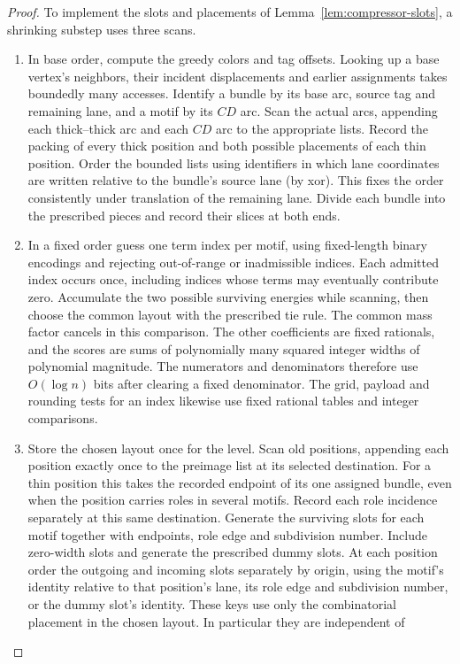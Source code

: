 \begin{proof}
To implement the slots and placements of Lemma~\ref{lem:compressor-slots},
a shrinking substep uses three scans.
\begin{enumerate}
\item In base order, compute the greedy colors and tag offsets. Looking
up a base vertex's neighbors, their incident displacements and earlier
assignments takes boundedly many accesses. Identify a bundle by its base
arc, source tag and remaining lane, and a motif by its $CD$ arc. Scan the
actual arcs, appending each thick--thick arc and each $CD$ arc to the
appropriate lists. Record the packing of every thick position and both
possible placements of each thin position. Order the bounded lists using
identifiers in which lane coordinates are written relative to the bundle's
source lane (by xor). This fixes the order consistently under translation
of the remaining lane. Divide each bundle into the prescribed pieces and
record their slices at both ends.
\item In a fixed order guess one term index per motif, using fixed-length
binary encodings and rejecting out-of-range or inadmissible indices. Each
admitted index occurs once, including indices whose terms may eventually
contribute zero. Accumulate the two possible surviving energies while
scanning, then choose the common layout with the prescribed tie rule. The
common mass factor cancels in this comparison. The other coefficients are
fixed rationals, and the scores are sums of polynomially many squared
integer widths of polynomial magnitude. The numerators and denominators
therefore use $O(\log n)$ bits after clearing a fixed denominator.
The grid, payload and rounding tests for an index likewise use fixed
rational tables and integer comparisons.
\item Store the chosen layout once for the level. Scan old positions,
appending each position exactly once to the preimage list at its selected
destination. For a thin position this takes the recorded endpoint of
its one assigned bundle, even when the position carries roles in several
motifs. Record each role incidence separately at this same destination.
Generate the surviving slots for each motif together with
endpoints, role edge and subdivision number. Include zero-width slots and
generate the prescribed dummy slots. At each position order the outgoing
and incoming slots separately by origin, using the motif's identity
relative to that position's lane, its role edge and subdivision number,
or the dummy slot's identity. These keys use only the combinatorial
placement in the chosen layout. In particular they are independent of

\end{enumerate}
\end{proof}
